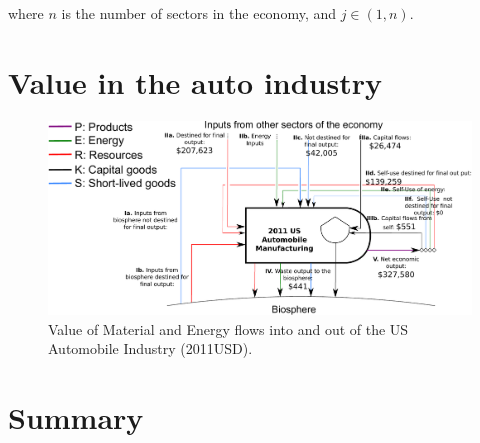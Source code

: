 \noindent where $n$ is the number of sectors in the economy, and $j \in (1, n)$.


\section{Value in the auto industry}
\label{sec:value_auto}

\begin{figure}[h!]
\centering
\includegraphics[width=1.0\linewidth]{Part_3/Chapter_Values/images/PERKS_basic_unit_value_auto_ind.pdf}
\caption{Value of Material and Energy flows into and out of the US Automobile Industry (2011USD).}
\label{fig:PERKS_value_auto_ind}
\end{figure}


\section{Summary}
\label{sec:value_summary}







%
%

